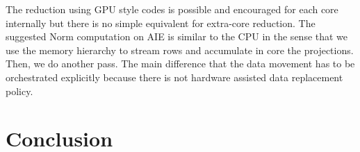 \documentclass[acmsmall]{acmart}
\begin{document}
The reduction using GPU style codes is possible and encouraged for
each core internally but there is no simple equivalent for extra-core
reduction. The suggested Norm computation on AIE is similar to the CPU
in the sense that we use the memory hierarchy to stream rows and
accumulate in core the projections. Then, we do another pass. The main
difference that the data movement has to be orchestrated explicitly
because there is not hardware assisted data replacement policy.






























\section{Conclusion}


  







%

 

%
\end{document}
